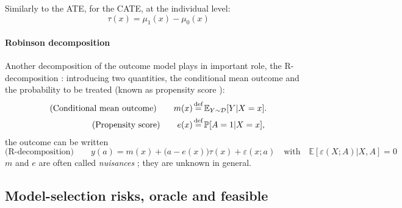 \documentclass[10pt]{article}
\newcommand\myeq{\stackrel{\mathclap{\text{def}}}{=}}
\begin{document}
\begin{multicols}{2}
    Similarly to the ATE, for the CATE, at the individual level:
    \begin{equation}
        \tau(x) = \mu_{1}(x) - \mu_{0}(x)
        \label{eq:cate_estimate}
    \end{equation}

    \paragraph{Robinson decomposition}
    Another decomposition of the outcome model plays in important role,
    the R-decomposition
    \cite{robinson_rootnconsistent_1988}:
    introducing two quantities, the conditional mean outcome
    and the probability to be treated (known as propensity score \cite{rosenbaum_central_1983}):
    \begin{align}
        \text{(Conditional mean outcome)} \qquad  m(x) \myeq \; & \mathbb E_{Y \sim \mathcal{D}} [Y|X=x].
        \label{def:m}
        \\
        \text{(Propensity score)}\qquad
        e(x) \myeq \;                                           & \mathbb P[A=1|X=x],
        \label{def:propensity_score}
    \end{align}
    the outcome can be written
    \begin{equation}\label{eq:r_decomposition}
        \text{(R-decomposition)}\qquad y(a) = m(x) + \big( a - e(x) \big) \tau(x) + \varepsilon(x; a) \quad\text{with}\quad \mathbb E[\varepsilon(X; A)|X, A] = 0
    \end{equation}
    $m$ and $e$ are often called
    \emph{nuisances} \cite{chernozhukov_double_2018}; they are unknown in
    general.


    \subsection{Model-selection risks, oracle and feasible}\label{sec:problem:model_selection}


\end{multicols}
\end{document}
